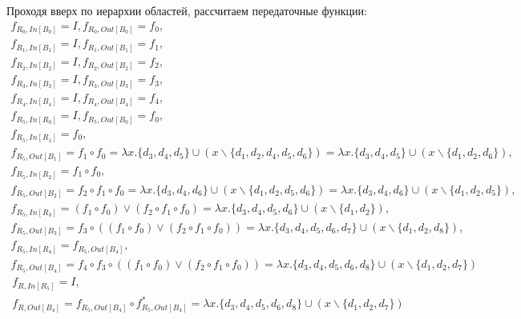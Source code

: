 \documentclass[11pt]{article}
\begin{document}
Проходя вверх по иерархии областей, рассчитаем передаточные функции:
\begin{gather*}
f_{R_0, In[B_0]} = I, f_{R_0, Out[B_0]} = f_0, \\
f_{R_1, In[B_1]} = I, f_{R_1, Out[B_1]} = f_1, \\
f_{R_2, In[B_2]} = I, f_{R_2, Out[B_2]} = f_2, \\
f_{R_3, In[B_3]} = I, f_{R_3, Out[B_3]} = f_3, \\
f_{R_4, In[B_4]} = I, f_{R_4, Out[B_4]} = f_4, \\
f_{R_5, In[R_0]} = I, f_{R_5, Out[B_0]} = f_0, \\
f_{R_5, In[R_1]} = f_0, \\
f_{R_5, Out[B_1]} = f_1 \circ f_0 = \lambda x. \{d_3, d_4, d_5\} \cup (x \backslash \{d_1, d_2, d_4, d_5, d_6\}) = \lambda x. \{d_3, d_4, d_5\} \cup (x \backslash \{d_1, d_2, d_6\}), \\
f_{R_5, In[R_2]} = f_1 \circ f_0, \\
f_{R_5, Out[B_2]} = f_2 \circ f_1 \circ f_0 = \lambda x. \{d_3, d_4, d_6\} \cup (x \backslash \{d_1, d_2, d_5, d_6\}) = \lambda x. \{d_3, d_4, d_6\} \cup (x \backslash \{d_1, d_2, d_5\}), \\
f_{R_5, In[R_3]} = (f_1 \circ f_0) \vee (f_2 \circ f_1 \circ f_0) = \lambda x. \{d_3, d_4, d_5, d_6\} \cup (x \backslash \{d_1, d_2\}), \\
f_{R_5, Out[B_3]} = f_3 \circ ((f_1 \circ f_0) \vee (f_2 \circ f_1 \circ f_0)) = \lambda x. \{d_3, d_4, d_5, d_6, d_7\} \cup (x \backslash \{d_1, d_2, d_8\}), \\
f_{R_5, In[R_4]} = f_{R_5, Out[B_4]}, \\
f_{R_5, Out[B_4]} = f_4 \circ f_3 \circ ((f_1 \circ f_0) \vee (f_2 \circ f_1 \circ f_0)) = \lambda x. \{d_3, d_4, d_5, d_6, d_8\} \cup (x \backslash \{d_1, d_2, d_7\})
\end{gather*}
\begin{gather*}
f_{R, In[R_5]} = I, \\
f_{R, Out[B_4]} = f_{R_5, Out[B_4]} \circ f_{R_5, Out[B_4]}^* = \lambda x. \{d_3, d_4, d_5, d_6, d_8\} \cup (x \backslash \{d_1, d_2, d_7\})
\end{gather*}
\end{document}
